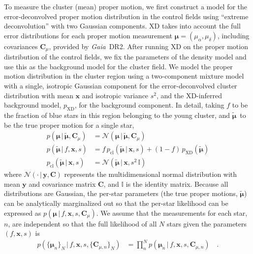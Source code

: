 \documentclass[twocolumn]{aastex62}
\newcommand{\acronym}[1]{{\small{#1}}}
\newcommand{\gaia}{\textsl{Gaia}}
\newcommand{\DR}[1]{\acronym{DR#1}}
\newcommand{\bs}[1]{\boldsymbol{#1}}
\newcommand{\given}{\,|\,}
\newcommand{\norm}{\mathcal{N}}
\newcommand{\mat}[1]{\mathbf{#1}}
\newcommand{\truepm}{\ensuremath{\tilde{\bs{\mu}}}}
\begin{document}
To measure the cluster (mean) proper motion, we first construct a model for the error-deconvolved proper motion distribution in the control fields using ``extreme deconvolution'' \citep[XD;][]{Bovy:2011} with two Gaussian components. XD takes into account the full error distributions for each proper motion measurement $\bs{\mu} = (\mu_\alpha, \mu_\delta)$, including covariances $\mat{C}_\mu$, provided by \gaia\ \DR{2}.
After running XD on the proper motion distribution of the control fields, we fix the parameters of the density model and use this as the background model for the cluster field.
We model the proper motion distribution in the cluster region using a two-component mixture model with a single, isotropic Gaussian component for the error-deconvolved cluster distribution with mean $\bs{x}$ and isotropic variance $s^2$, and the XD-inferred background model, $p_{\textrm{XD}}$, for the background component.
In detail, taking $f$ to be the fraction of blue stars in this region belonging to the young cluster, and \truepm\ to be the true proper motion for a single star,
\begin{align}
    p(\bs{\mu} \given \truepm, \mat{C}_\mu) &=
        \norm(\bs{\mu} \given \truepm, \mat{C}_\mu)\\
    p(\truepm \given f, \bs{x}, s) &=
        f \, p_{\textrm{cl}}(\truepm \given \bs{x}, s)
        + (1-f) \, p_{\textrm{XD}}(\truepm)\\
    p_{\textrm{cl}}(\truepm \given \bs{x}, s) &=
        \norm(\truepm \given \bs{x}, s^2 \, \mathbb{I})
\end{align}
where $\norm(\cdot \given \bs{y}, \mat{C})$ represents the multidimensional normal distribution with mean $\bs{y}$ and covariance matrix $\mat{C}$, and $\mathbb{I}$ is the identity matrix.
Because all distributions are Gaussian, the per-star parameters (the true proper motions, \truepm) can be analytically marginalized out so that the per-star likelihood can be expressed as $p(\bs{\mu} \given f, \bs{x}, s, \mat{C}_\mu)$.
We assume that the measurements for each star, $n$, are independent so that the full likelihood of all $N$ stars given the parameters $(f, \bs{x}, s)$ is
\begin{align}
    p(\{\bs{\mu}_n\}_N \given f, \bs{x}, s, \{\mat{C}_{\mu, n}\}_N) &=
        \prod_n^N p(\bs{\mu}_n \given f, \bs{x}, s, \mat{C}_{\mu, n}) \quad .
        \label{eq:likelihood}
\end{align}
\end{document}
